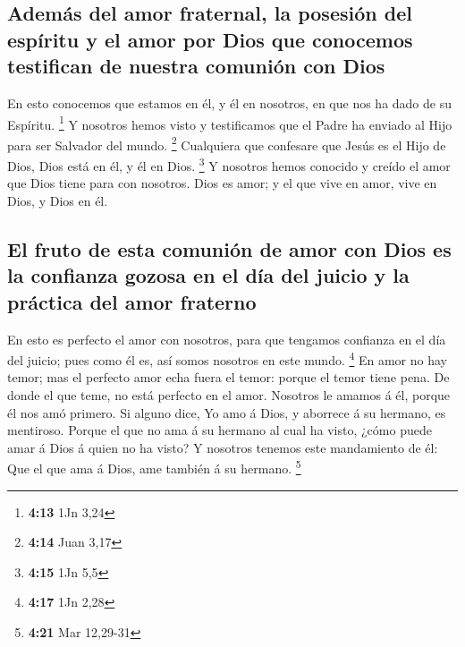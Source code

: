\hypertarget{ademuxe1s-del-amor-fraternal-la-posesiuxf3n-del-espuxedritu-y-el-amor-por-dios-que-conocemos-testifican-de-nuestra-comuniuxf3n-con-dios}{%
\subsection{Además del amor fraternal, la posesión del espíritu y el
amor por Dios que conocemos testifican de nuestra comunión con
Dios}\label{ademuxe1s-del-amor-fraternal-la-posesiuxf3n-del-espuxedritu-y-el-amor-por-dios-que-conocemos-testifican-de-nuestra-comuniuxf3n-con-dios}}

 En esto conocemos que estamos en él, y él en nosotros,
en que nos ha dado de su Espíritu. \footnote{\textbf{4:13} 1Jn 3,24}
 Y nosotros hemos visto y testificamos que el Padre ha
enviado al Hijo para ser Salvador del mundo. \footnote{\textbf{4:14}
  Juan 3,17}  Cualquiera que confesare que Jesús es el
Hijo de Dios, Dios está en él, y él en Dios. \footnote{\textbf{4:15} 1Jn
  5,5}  Y nosotros hemos conocido y creído el amor que
Dios tiene para con nosotros. Dios es amor; y el que vive en amor, vive
en Dios, y Dios en él.

\hypertarget{el-fruto-de-esta-comuniuxf3n-de-amor-con-dios-es-la-confianza-gozosa-en-el-duxeda-del-juicio-y-la-pruxe1ctica-del-amor-fraterno}{%
\subsection{El fruto de esta comunión de amor con Dios es la confianza
gozosa en el día del juicio y la práctica del amor
fraterno}\label{el-fruto-de-esta-comuniuxf3n-de-amor-con-dios-es-la-confianza-gozosa-en-el-duxeda-del-juicio-y-la-pruxe1ctica-del-amor-fraterno}}

 En esto es perfecto el amor con nosotros, para que
tengamos confianza en el día del juicio; pues como él es, así somos
nosotros en este mundo. \footnote{\textbf{4:17} 1Jn 2,28}
 En amor no hay temor; mas el perfecto amor echa fuera el
temor: porque el temor tiene pena. De donde el que teme, no está
perfecto en el amor.  Nosotros le amamos á él, porque él
nos amó primero.  Si alguno dice, Yo amo á Dios, y
aborrece á su hermano, es mentiroso. Porque el que no ama á su hermano
al cual ha visto, ¿cómo puede amar á Dios á quien no ha visto?
 Y nosotros tenemos este mandamiento de él: Que el que
ama á Dios, ame también á su hermano. \footnote{\textbf{4:21} Mar
  12,29-31}

